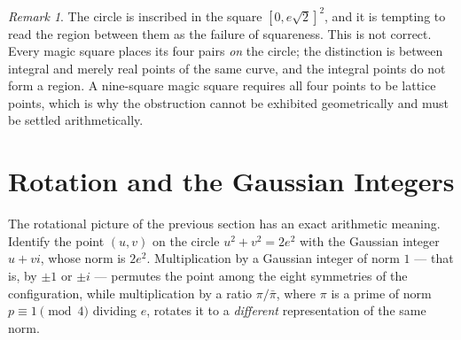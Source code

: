 \documentclass[12pt]{article}
\theoremstyle{remark}
\newtheorem{remark}[theorem]{Remark}
\begin{document}
\begin{remark}
The circle is inscribed in the square $[0, e\sqrt2]^2$, and it is
tempting to read the region between them as the failure of squareness.
This is not correct. Every magic square places its four pairs
\emph{on} the circle; the distinction is between integral and merely
real points of the same curve, and the integral points do not form a
region. A nine-square magic square requires all four points to be
lattice points, which is why the obstruction cannot be exhibited
geometrically and must be settled arithmetically.
\end{remark}

\section{Rotation and the Gaussian Integers}\label{sec:rotation}

The rotational picture of the previous section has an exact arithmetic
meaning. Identify the point $(u,v)$ on the circle $u^2+v^2 = 2e^2$ with
the Gaussian integer $u + vi$, whose norm is $2e^2$. Multiplication by
a Gaussian integer of norm $1$ --- that is, by $\pm1$ or $\pm i$ ---
permutes the point among the eight symmetries of the configuration,
while multiplication by a ratio $\pi/\bar\pi$, where $\pi$ is a prime
of norm $p \equiv 1 \pmod 4$ dividing $e$, rotates it to a
\emph{different} representation of the same norm.

\begin{center}
\end{center}

\begin{center}
\end{center}
\end{document}
